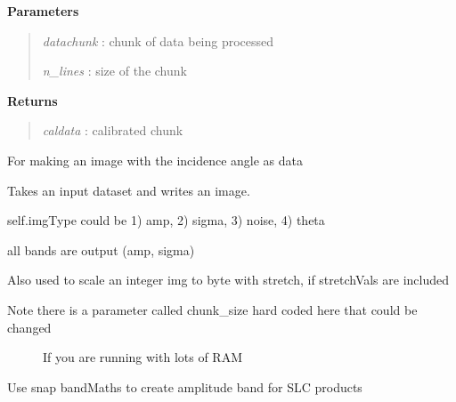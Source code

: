 \documentclass[letterpaper,10pt,openany,oneside]{sphinxmanual}
\begin{document}
\begin{fulllineitems}
\begin{fulllineitems}
\textbf{Parameters}
\begin{quote}

\emph{datachunk} : chunk of data being processed

\emph{n\_lines} : size of the chunk
\end{quote}

\textbf{Returns}
\begin{quote}

\emph{caldata} : calibrated chunk
\end{quote}

\end{fulllineitems}


\begin{fulllineitems}
\label{code:Image.Image.getTheta}
For making an image with the incidence angle as data

\end{fulllineitems}


\begin{fulllineitems}
\label{code:Image.Image.imgWrite}
Takes an input dataset and writes an image.

self.imgType could be 1) amp, 2) sigma, 3) noise, 4) theta

all bands are output (amp, sigma)

Also used to scale an integer img to byte with stretch, if stretchVals are included
\begin{description}
\item[{Note there is a parameter called chunk\_size hard coded here that could be changed }] \leavevmode
If you are running with lots of RAM

\end{description}

\end{fulllineitems}


\begin{fulllineitems}
\label{code:Image.Image.makeAmp}
Use snap bandMaths to create amplitude band for SLC products

\end{fulllineitems}


\end{fulllineitems}
\end{document}
